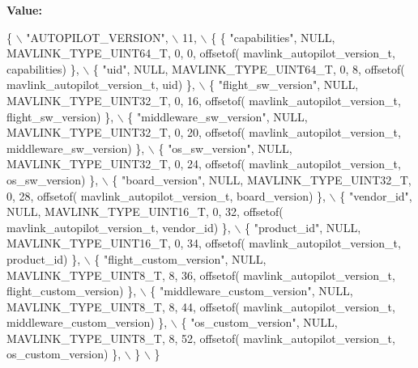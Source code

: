 {\bfseries Value\+:}
\begin{DoxyCode}
\{ \(\backslash\)
    \textcolor{stringliteral}{"AUTOPILOT\_VERSION"}, \(\backslash\)
    11, \(\backslash\)
    \{  \{ \textcolor{stringliteral}{"capabilities"}, NULL, MAVLINK_TYPE_UINT64_T, 0, 0, offsetof(
      mavlink_autopilot_version_t, capabilities) \}, \(\backslash\)
         \{ \textcolor{stringliteral}{"uid"}, NULL, MAVLINK_TYPE_UINT64_T, 0, 8, offsetof(
      mavlink_autopilot_version_t, uid) \}, \(\backslash\)
         \{ \textcolor{stringliteral}{"flight\_sw\_version"}, NULL, MAVLINK_TYPE_UINT32_T, 0, 16, offsetof(
      mavlink_autopilot_version_t, flight\_sw\_version) \}, \(\backslash\)
         \{ \textcolor{stringliteral}{"middleware\_sw\_version"}, NULL, MAVLINK_TYPE_UINT32_T, 0, 20, offsetof(
      mavlink_autopilot_version_t, middleware\_sw\_version) \}, \(\backslash\)
         \{ \textcolor{stringliteral}{"os\_sw\_version"}, NULL, MAVLINK_TYPE_UINT32_T, 0, 24, offsetof(
      mavlink_autopilot_version_t, os\_sw\_version) \}, \(\backslash\)
         \{ \textcolor{stringliteral}{"board\_version"}, NULL, MAVLINK_TYPE_UINT32_T, 0, 28, offsetof(
      mavlink_autopilot_version_t, board\_version) \}, \(\backslash\)
         \{ \textcolor{stringliteral}{"vendor\_id"}, NULL, MAVLINK_TYPE_UINT16_T, 0, 32, offsetof(
      mavlink_autopilot_version_t, vendor\_id) \}, \(\backslash\)
         \{ \textcolor{stringliteral}{"product\_id"}, NULL, MAVLINK_TYPE_UINT16_T, 0, 34, offsetof(
      mavlink_autopilot_version_t, product\_id) \}, \(\backslash\)
         \{ \textcolor{stringliteral}{"flight\_custom\_version"}, NULL, MAVLINK_TYPE_UINT8_T, 8, 36, offsetof(
      mavlink_autopilot_version_t, flight\_custom\_version) \}, \(\backslash\)
         \{ \textcolor{stringliteral}{"middleware\_custom\_version"}, NULL, MAVLINK_TYPE_UINT8_T, 8, 44, offsetof(
      mavlink_autopilot_version_t, middleware\_custom\_version) \}, \(\backslash\)
         \{ \textcolor{stringliteral}{"os\_custom\_version"}, NULL, MAVLINK_TYPE_UINT8_T, 8, 52, offsetof(
      mavlink_autopilot_version_t, os\_custom\_version) \}, \(\backslash\)
         \} \(\backslash\)
\}
\end{DoxyCode}
\mbox{\label{mavlink__msg__autopilot__version_8h_a351556b8cbf51f8b88206e4fbfca7f59}} 
